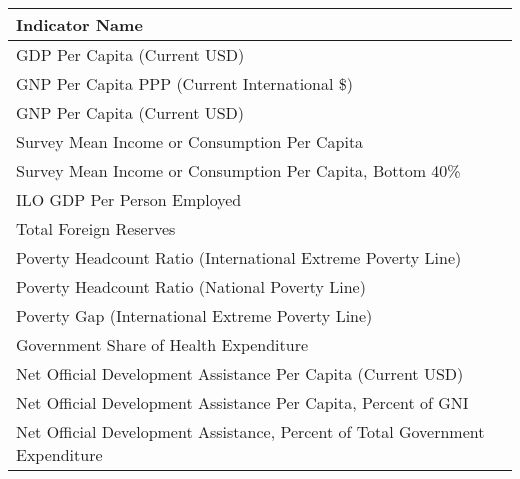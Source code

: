 \begin{tabular}{l}
\toprule
                                                              Indicator Name \\
\midrule
GDP Per Capita (Current USD) \\
GNP Per Capita PPP (Current International \$) \\
GNP Per Capita (Current USD) \\
Survey Mean Income or Consumption Per Capita \\
Survey Mean Income or Consumption Per Capita, Bottom 40\% \\
ILO GDP Per Person Employed \\
Total Foreign Reserves \\
Poverty Headcount Ratio (International Extreme Poverty Line) \\
Poverty Headcount Ratio (National Poverty Line) \\
Poverty Gap (International Extreme Poverty Line) \\
Government Share of Health Expenditure \\
Net Official Development Assistance Per Capita (Current USD) \\
Net Official Development Assistance Per Capita, Percent of GNI \\
Net Official Development Assistance, Percent of Total Government Expenditure \\
\bottomrule
\end{tabular}
